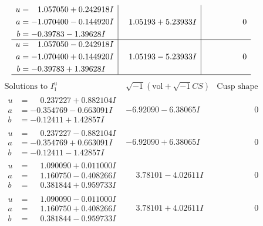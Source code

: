 \documentclass[1p]{elsarticle_modified}
\theoremstyle{definition}
\newcommand{\I}{\sqrt{-1}}
\begin{document}
$$\begin{array}{c|c|c}
\begin{aligned}
u &= \phantom{-}1.057050 + 0.242918 I \\
a &= -1.070400 - 0.144920 I \\
b &= -0.39783 - 1.39628 I\end{aligned}
 & \phantom{-}1.05193 + 5.23933 I & \phantom{-0.000000 } 0 \\ \hline\begin{aligned}
u &= \phantom{-}1.057050 - 0.242918 I \\
a &= -1.070400 + 0.144920 I \\
b &= -0.39783 + 1.39628 I\end{aligned}
 & \phantom{-}1.05193 - 5.23933 I & \phantom{-0.000000 } 0\\
 \hline 
 \end{array}$$\newpage$$\begin{array}{c|c|c}  
\text{Solutions to }I^u_{1}& \I (\text{vol} + \sqrt{-1}CS) & \text{Cusp shape}\\
 \hline 
\begin{aligned}
u &= \phantom{-}0.237227 + 0.882104 I \\
a &= -0.354769 - 0.663091 I \\
b &= -0.12411 + 1.42857 I\end{aligned}
 & -6.92090 - 6.38065 I & \phantom{-0.000000 } 0 \\ \hline\begin{aligned}
u &= \phantom{-}0.237227 - 0.882104 I \\
a &= -0.354769 + 0.663091 I \\
b &= -0.12411 - 1.42857 I\end{aligned}
 & -6.92090 + 6.38065 I & \phantom{-0.000000 } 0 \\ \hline\begin{aligned}
u &= \phantom{-}1.090090 + 0.011000 I \\
a &= \phantom{-}1.160750 - 0.408266 I \\
b &= \phantom{-}0.381844 + 0.959733 I\end{aligned}
 & \phantom{-}3.78101 - 4.02611 I & \phantom{-0.000000 } 0 \\ \hline\begin{aligned}
u &= \phantom{-}1.090090 - 0.011000 I \\
a &= \phantom{-}1.160750 + 0.408266 I \\
b &= \phantom{-}0.381844 - 0.959733 I\end{aligned}
 & \phantom{-}3.78101 + 4.02611 I & \phantom{-0.000000 } 0 \\ \hline\begin{aligned}

\end{aligned}
\end{array}$$
\end{document}
